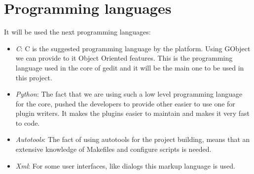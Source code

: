 \section{Programming languages}\label{sec:ProgrammingLanguages}

It will be used the next programming languages:
\begin{itemize}
  \item \emph{C}: C is the suggested programming language by the platform. Using GObject we can provide to it Object Oriented features. This is the programming language used in the core of gedit and it will be the main one to be used in this project.
  \item \emph{Python}: The fact that we are using such a low level programming language for the core, pushed the developers to provide other easier to use one for plugin writers. It makes the plugins easier to maintain and makes it very fast to code.
  \item \emph{Autotools}: The fact of using autotools for the project building, means that an extensive knowledge of Makefiles and configure scripts is needed.
  \item \emph{Xml}: For some user interfaces, like dialogs this markup language is used.
\end{itemize}
